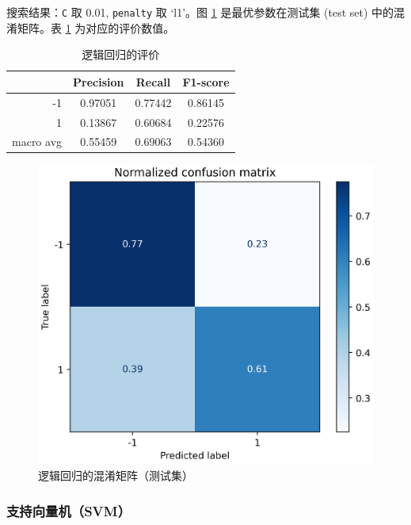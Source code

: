 \documentclass[a4paper]{article}
\begin{document}
搜索结果：\texttt{C} 取 0.01, \texttt{penalty} 取 `l1'。图 \ref{fig:result:lg} 是最优参数在测试集 (test set) 中的混淆矩阵。表 \ref{tb:lg} 为对应的评价数值。

\begin{table}[!h]
    \centering
    \renewcommand{\arraystretch}{1.5}
    \begin{tabular}{|r|c|c|c|}
        \hline
                  & Precision & Recall & F1-score \\ \hline
        -1        &     0.97051     &     0.77442   &    0.86145      \\ \hline
        1         &     0.13867      &     0.60684   &   0.22576       \\ \hline
        macro avg &      0.55459     &     0.69063   &    0.54360      \\ \hline
    \end{tabular}
    \caption{逻辑回归的评价}
    \label{tb:lg}
\end{table}
\begin{figure}[!h]
    \centering
    \includegraphics[width=0.48\linewidth]{LR_confus_mat-norm.png}
    \caption{逻辑回归的混淆矩阵（测试集）}
    \label{fig:result:lg}
\end{figure}

\subsubsection{支持向量机（SVM）}
\end{document}
